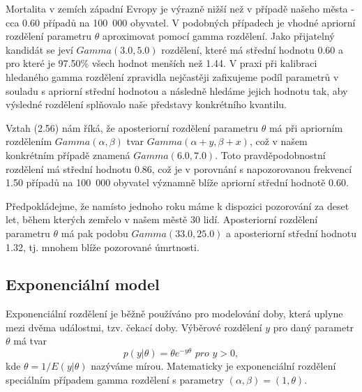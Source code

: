 Mortalita v zemích západní Evropy je výrazně nižší než v případě našeho města - cca 0.60 případů na 100~000 obyvatel. V podobných případech je vhodné apriorní rozdělení parametru $\theta$ aproximovat pomocí gamma rozdělení. Jako přijatelný kandidát se jeví $Gamma(3.0, 5.0)$ rozdělení, které má střední hodnotu 0.60 a pro které je 97.50\% všech hodnot menších než 1.44. V praxi při kalibraci hledaného gamma rozdělení zpravidla nejčastěji zafixujeme podíl parametrů v souladu s apriorní střední hodnotou a následně hledáme jejich hodnotu tak, aby výsledné rozdělení splňovalo naše představy konkrétního kvantilu.

Vztah (2.56) nám říká, že aposteriorní rozdělení parametru $\theta$ má při apriorním rozdělením $Gamma(\alpha, \beta)$ tvar $Gamma(\alpha + y, \beta + x)$, což v našem konkrétním případě znamená $Gamma(6.0, 7.0)$. Toto pravděpodobnostní rozdělení má střední hodnotu 0.86, což je v porovnání s napozorovanou frekvencí 1.50 případů na 100~000 obyvatel významně blíže apriorní střední hodnotě 0.60.

Předpokládejme, že namísto jednoho roku máme k dispozici pozorování za deset let, během kterých zemřelo v našem městě 30 lidí. Aposteriorní rozdělení parametru $\theta$ má pak podobu $Gamma(33.0, 25.0)$ a aposteriorní střední hodnotu 1.32, tj. mnohem blíže pozorované úmrtnosti.

\subsection{Exponenciální model}

Exponenciální rozdělení je běžně používáno pro modelování doby, která uplyne mezi dvěma událostmi, tzv. čekací doby. Výběrové rozdělení $y$ pro daný parametr $\theta$ má tvar
\begin{equation}
p(y|\theta) = \theta e^{-y \theta} \textit{ pro } y > 0,
\end{equation}
kde $\theta = 1 / E(y | \theta)$ nazýváme mírou. Matematicky je exponenciální rozdělení speciálním případem gamma rozdělení s parametry $(\alpha, \beta) = (1, \theta)$.

